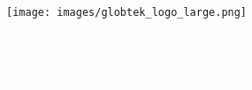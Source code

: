 \documentclass[12pt]{article}
\begin{document}
\begin{titlepage}

\noindent

\begin{minipage}[c][1in][c]{1in}
        \texttt{[image: images/globtek\_logo\_large.png]} %
    \end{minipage}%
    \begin{minipage}[c][1in][c]{\dimexpr\textwidth-1in\relax}
        \colorbox{customred}{%
            \parbox[b][1in][c]{\linewidth}{%
                \hfill
                \begin{minipage}[c][1in][c]{0.95\linewidth}
                    \raggedleft
                    \textcolor{white}{\textbf{[Model Number]}\\
                    \textbf{[Model Name]}\\
                    \textit{Engineering Test Report}}
                \end{minipage}
            }
        }
\end{minipage}


\vspace{1cm} %




\begin{center}

\vspace{0.5cm}


\vspace{0.5cm}



\end{center}
\end{titlepage}



\end{document}
